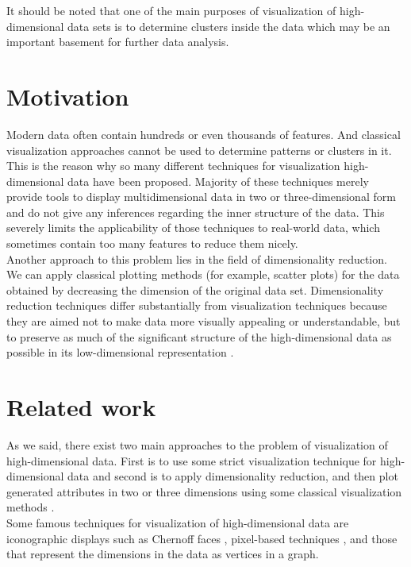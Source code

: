 It should be noted that one of the main purposes of visualization of high-dimensional data sets is to determine clusters inside the data which may be an important basement for further data analysis.


\section{Motivation}

Modern data often contain hundreds or even thousands of features. And classical visualization approaches cannot be used to determine patterns or clusters in it. This is the reason why so many different techniques for visualization high-dimensional data have been proposed. Majority of these techniques merely provide tools to display multidimensional data in two or three-dimensional form and do not give any inferences regarding the inner structure of the data. This severely limits the applicability of those techniques to real-world data, which sometimes contain too many features to reduce them nicely.\\

Another approach to this problem lies in the field of dimensionality reduction. We can apply classical plotting methods (for example, scatter plots) for the data obtained by decreasing the dimension of the original data set. Dimensionality reduction techniques differ substantially from visualization techniques because they are aimed not to make data more visually appealing or understandable, but to preserve as much of the significant structure of the high-dimensional data as possible in its low-dimensional representation \cite{tsnearticle}.

\section{Related work}

As we said, there exist two main approaches to the problem of visualization of high-dimensional data. First is to use some strict visualization technique for high-dimensional data and second is to apply dimensionality reduction, and then plot generated attributes in two or three dimensions using some classical visualization methods \cite{tsnearticle}. \\


Some famous techniques for visualization of high-dimensional data are iconographic displays such as Chernoff faces \cite{chernoff}, pixel-based techniques \cite{keim}, and those that represent the dimensions in the data as vertices in a graph.\\


